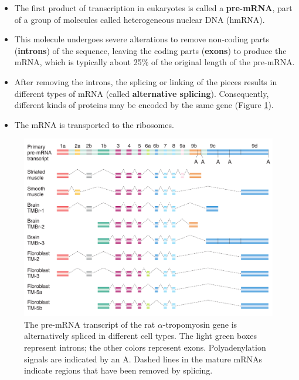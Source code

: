 \documentclass[11pt,ignorenonframetext,aspectratio=169]{beamer}
\providecommand{\tightlist}{%
  \setlength{\itemsep}{0pt}\setlength{\parskip}{0pt}}
\begin{document}
\begin{frame}{}
\protect\hypertarget{section-24}{}
\begin{itemize}
\tightlist
\item
  The first product of transcription in eukaryotes is called a
  \textbf{pre-mRNA}, part of a group of molecules called heterogeneous
  nuclear DNA (hmRNA).
\item
  This molecule undergoes severe alterations to remove non-coding parts
  (\textbf{introns}) of the sequence, leaving the coding parts
  (\textbf{exons}) to produce the mRNA, which is typically about 25\% of
  the original length of the pre-mRNA.
\item
  After removing the introns, the splicing or linking of the pieces
  results in different types of mRNA (called \textbf{alternative
  splicing}). Consequently, different kinds of proteins may be encoded
  by the same gene (Figure \ref{fig:mrna-alternative-splicing}).
\item
  The mRNA is transported to the ribosomes.
\end{itemize}
\end{frame}

\begin{frame}{}
\protect\hypertarget{section-25}{}
\begin{figure}
\includegraphics[width=0.65\linewidth]{../images/alternative_splicing} \caption{The pre-mRNA transcript of the rat $\alpha$-tropomyosin gene is alternatively spliced in different cell types. The light green boxes represent introns; the other colors represent exons. Polyadenylation signals are indicated by an A. Dashed lines in the mature mRNAs indicate regions that have been removed by splicing.}\label{fig:mrna-alternative-splicing}
\end{figure}
\end{frame}
\end{document}
